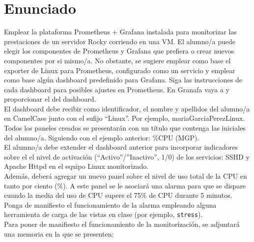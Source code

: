 \documentclass[12pt]{article}
\newcommand{\icode}[1]{\colorbox{codebg}{\texttt{\detokenize{#1}}}}
\begin{document}
\sffamily
    \portada[%
        titulo=Ingeniería de Servidores (Prácticas),
        subtitulo=Monitorización de Servidor Linux ,
        autor=Jesús Muñoz Velasco,
        año=Curso 2024-2025]
        
    \thispagestyle{empty}
    \tableofcontents
    \newpage

    \section{Enunciado}
Emplear la plataforma Prometheus + Grafana instalada para monitorizar las prestaciones de un servidor Rocky corriendo en una VM. El alumno/a puede elegir los componentes de Prometheus y Grafana que prefiera o crear nuevos componentes por si mismo/a. No obstante, se sugiere emplear como base el exporter de Linux para Prometheus, configurado como un servicio  y emplear como base algún dashboard predefinido para Grafana. Siga las instrucciones de cada dashboard para posibles ajustes en Prometheus. En Granafa vaya a
\icode{Dashboards -> Import} y proporcionar el \icode{Id} del dashboard.\\


El dashboard debe recibir como identificador, el nombre y apellidos del alumno/a en CamelCase junto con el sufijo “Linux”. Por ejemplo, mariaGarciaPerezLinux. Todos los paneles creados se presentarán con un título que contenga las iniciales del alumno/a. Siguiendo con el ejemplo
anterior: \%CPU (MGP). \\

El alumno/a debe extender el dashboard anterior para incorporar indicadores sobre el el nivel de activación (“Activo”/”Inactivo”, 1/0) de los servicios: SSHD y Apache Httpd en el equipo Linux monitorizado. \\

Además, deberá agregar un nuevo panel sobre el nivel de uso total de la CPU en tanto por ciento (\%). A este panel se le asociará una alarma para que se dispare cuando la media del uso de CPU supere el 75\% de CPU durante 5 minutos. Ponga de manifiesto el funcionamiento de la alarma empleando alguna herramienta de carga de las vistas en clase (por ejemplo, \verb|stress|).\\

Para poner de manifiesto el funcionamiento de la monitorización, se adjuntará una memoria en la
que se presenten:
\end{document}
